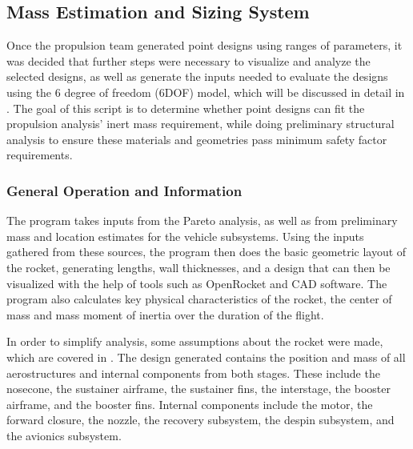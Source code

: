 \subsection{Mass Estimation and Sizing System}
Once the propulsion team generated point designs using ranges of parameters, it was decided that further steps were necessary to visualize and analyze the selected designs, as well as generate the inputs needed to evaluate the designs using the 6 degree of freedom (6DOF) model, which will be discussed in detail in . The goal of this script is to determine whether point designs can fit the propulsion analysis' inert mass requirement, while doing preliminary structural analysis to ensure these materials and geometries pass minimum safety factor requirements.


\subsubsection{General Operation and Information}
The program takes inputs from the Pareto analysis, as well as from preliminary mass and location estimates for the vehicle subsystems. Using the inputs gathered from these sources, the program then does the basic geometric layout of the rocket, generating lengths, wall thicknesses, and a design that can then be visualized with the help of tools such as OpenRocket and CAD software. The program also calculates key physical characteristics of the rocket, the center of mass and mass moment of inertia over the duration of the flight.

In order to simplify analysis, some assumptions about the rocket were made, which are covered in . The design generated contains the position and mass of all aerostructures and internal components from both stages. These include the nosecone, the sustainer airframe, the sustainer fins, the interstage, the booster airframe, and the booster fins. Internal components include the motor, the forward closure, the nozzle, the recovery subsystem, the despin subsystem, and the avionics subsystem.

